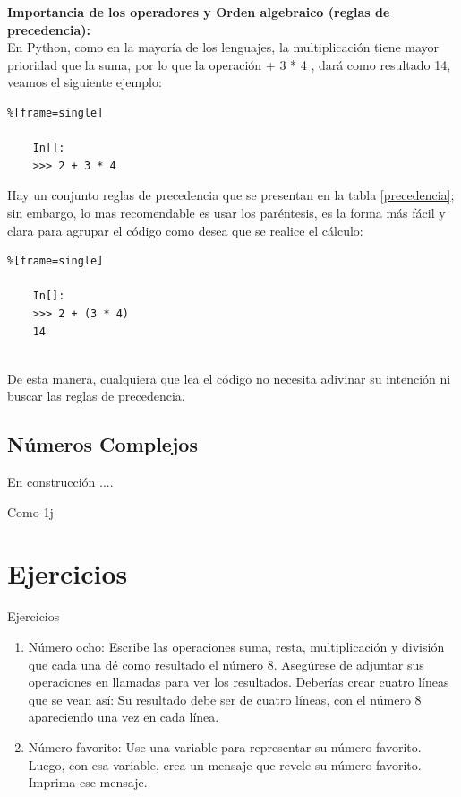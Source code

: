 {\bf Importancia de los operadores y Orden algebraico (reglas de precedencia):}\\

En Python, como en la mayoría de los lenguajes, la multiplicación tiene
mayor prioridad que la suma, por lo que la operación { + 3 * 4 }, dará como resultado   14, veamos el siguiente ejemplo: 

\begin{lstlisting}%[frame=single]
	
	In[]:	
	>>> 2 + 3 * 4	
\end{lstlisting}


Hay un conjunto reglas de precedencia que se presentan en la tabla \ref{precedencia}; sin embargo, lo mas recomendable es usar los paréntesis, es la forma más fácil y clara para agrupar el código como desea que se realice el cálculo: \label{precedencia}
\begin{lstlisting}%[frame=single]
	
	In[]:
	>>> 2 + (3 * 4)
	14
	
\end{lstlisting}

De esta manera, cualquiera que lea el código no necesita adivinar su intención ni buscar las reglas de precedencia.





\subsection{Números Complejos}

En construcción ....

Como {\ttfamily 1j}

\section{Ejercicios}\label{Tarea4}

Ejercicios 
\begin{enumerate}[3.3.8]
	
	\item Número ocho: Escribe las operaciones suma, resta, multiplicación y división 
	que cada una dé como resultado el número 8. 
	Asegúrese de adjuntar sus operaciones en llamadas {} para ver los resultados.
	Deberías crear cuatro líneas que se vean así: {} Su resultado debe ser de cuatro líneas,
	con el número 8 apareciendo una vez en cada línea.
	
	\item  Número favorito: Use una variable para representar su número favorito. Luego,
	con esa variable, crea un mensaje que revele su número favorito. Imprima ese mensaje.
	
\end{enumerate}




